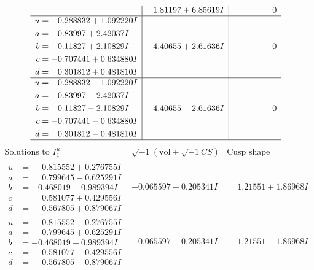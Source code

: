 \documentclass[1p]{elsarticle_modified}
\theoremstyle{definition}
\newcommand{\I}{\sqrt{-1}}
\begin{document}
$$\begin{array}{c|c|c}
 & \phantom{-}1.81197 + 6.85619 I & \phantom{-0.000000 } 0 \\ \hline\begin{aligned}
u &= \phantom{-}0.288832 + 1.092220 I \\
a &= -0.83997 + 2.42037 I \\
b &= \phantom{-}0.11827 + 2.10829 I \\
c &= -0.707441 + 0.634880 I \\
d &= \phantom{-}0.301812 + 0.481810 I\end{aligned}
 & -4.40655 + 2.61636 I & \phantom{-0.000000 } 0 \\ \hline\begin{aligned}
u &= \phantom{-}0.288832 - 1.092220 I \\
a &= -0.83997 - 2.42037 I \\
b &= \phantom{-}0.11827 - 2.10829 I \\
c &= -0.707441 - 0.634880 I \\
d &= \phantom{-}0.301812 - 0.481810 I\end{aligned}
 & -4.40655 - 2.61636 I & \phantom{-0.000000 } 0\\
 \hline 
 \end{array}$$\newpage$$\begin{array}{c|c|c}  
\text{Solutions to }I^u_{1}& \I (\text{vol} + \sqrt{-1}CS) & \text{Cusp shape}\\
 \hline 
\begin{aligned}
u &= \phantom{-}0.815552 + 0.276755 I \\
a &= \phantom{-}0.799645 - 0.625291 I \\
b &= -0.468019 + 0.989394 I \\
c &= \phantom{-}0.581077 + 0.429556 I \\
d &= \phantom{-}0.567805 + 0.879067 I\end{aligned}
 & -0.065597 - 0.205341 I & \phantom{-}1.21551 + 1.86968 I \\ \hline\begin{aligned}
u &= \phantom{-}0.815552 - 0.276755 I \\
a &= \phantom{-}0.799645 + 0.625291 I \\
b &= -0.468019 - 0.989394 I \\
c &= \phantom{-}0.581077 - 0.429556 I \\
d &= \phantom{-}0.567805 - 0.879067 I\end{aligned}
 & -0.065597 + 0.205341 I & \phantom{-}1.21551 - 1.86968 I \\ \hline\begin{aligned}

\end{aligned}
\end{array}$$
\end{document}
